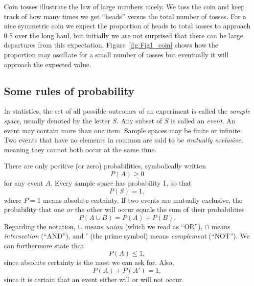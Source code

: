 Coin tosses illustrate the law of large numbers nicely.  We toss the coin and keep track of how many
times we get ``heads'' versus the total number of tosses.  For a nice symmetric coin we expect the
proportion of heads to total tosses to approach 0.5 over the long haul, but initially we are not surprised
that there can be large departures from this expectation.  Figure~\ref{fig:Fig1_coin} shows how the
proportion may oscillate for a small number of tosses but eventually it will approach the expected value.

\subsection{Some rules of probability}
	In statistics, the set of all possible outcomes of an experiment is called the \emph{sample space}, 
usually denoted by the letter $S$.  Any subset of $S$ is called an \emph{event}.  An event may contain more 
than one item.  Sample spaces may be finite or infinite.  Two events that have no elements in 
common are said to be \emph{mutually exclusive}, meaning they cannot both occur at the same time.

There are only positive (or zero) probabilities, symbolically written
\begin{equation}
P(A) \geq 0
\end{equation}
for any event $A$.
Every sample space has probability 1, so that
\begin{equation}
P(S) = 1,
\end{equation}
where $P = 1$ means absolute certainty.
If two events are mutually exclusive, the probability that one \emph{or} the other will occur equals the 
sum of their probabilities
\begin{equation}
P(A \cup B) = P (A) + P(B).
\label{eq:add_probe}
\end{equation}
Regarding the notation, $\cup$ means \emph{union} (which we read as ``OR''),  $\cap$ means \emph{intersection} (``AND''), and $'$ 
(the prime symbol) means \emph{complement} (``NOT''). We can furthermore state that
\begin{equation}
	P(A)\leq 1,
\end{equation}
since absolute certainty is the most we can ask for.  Also,
\begin{equation}
P(A) + P(A') = 1,
\end{equation}
since it is certain that an event either will or will not occur.


